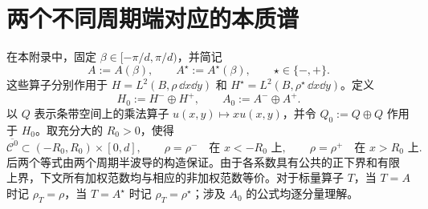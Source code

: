 
\section{两个不同周期端对应的本质谱}
\label{app:essential-spectrum}

在本附录中，固定
$\beta\in[-\pi/d,\pi/d)$，并简记
\[
  A:=A(\beta),\qquad A^\star:=A^\star(\beta),
  \qquad \star\in\{-,+\}.
\]
这些算子分别作用于
$H=L^2(B,\rho\,\dd x\dd y)$ 和
$H^\star=L^2(B,\rho^\star\,\dd x\dd y)$。定义
\begin{equation}
  H_0:=H^-\oplus H^+,
  \qquad A_0:=A^-\oplus A^+.
  \label{eq:appendix-free-operator}
\end{equation}
以 $Q$ 表示条带空间上的乘法算子 $u(x,y)\mapsto xu(x,y)$，并令
$Q_0:=Q\oplus Q$ 作用于 $H_0$。取充分大的 $R_0>0$，使得
\[
  \overline{\mathcal C^0}\subset(-R_0,R_0)\times[0,d],
  \qquad
  \rho=\rho^-\quad\text{在 }x<-R_0\text{ 上},
  \qquad
  \rho=\rho^+\quad\text{在 }x>R_0\text{ 上}.
\]
后两个等式由两个周期半波导的构造保证。由于各系数具有公共的正下界和有限
上界，下文所有加权范数均与相应的非加权范数等价。对于标量算子 $T$，当
$T=A$ 时记 $\rho_T=\rho$，当 $T=A^\star$ 时记
$\rho_T=\rho^\star$；涉及 $A_0$ 的公式均逐分量理解。

